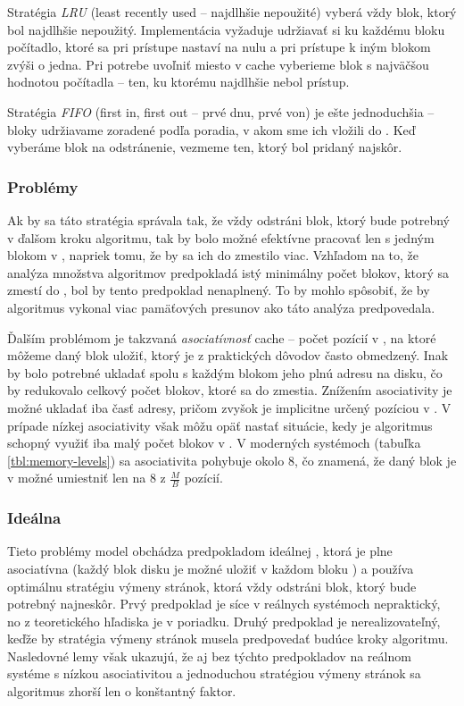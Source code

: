 Stratégia \emph{LRU} (least recently used -- najdlhšie nepoužité) vyberá vždy blok, ktorý bol najdlhšie nepoužitý. Implementácia vyžaduje udržiavať si ku každému bloku počítadlo, ktoré sa pri prístupe nastaví na nulu a pri prístupe k iným blokom zvýši o jedna. Pri potrebe uvoľniť miesto v cache vyberieme blok s najväčšou hodnotou počítadla -- ten, ku ktorému najdlhšie nebol prístup.

Stratégia \emph{FIFO} (first in, first out -- prvé dnu, prvé von) je ešte jednoduchšia -- bloky udržiavame zoradené podľa poradia, v akom sme ich vložili do \cache. Keď vyberáme blok na odstránenie, vezmeme ten, ktorý bol pridaný najskôr.

\subsubsection{Problémy}

Ak by sa táto stratégia správala tak, že vždy odstráni blok, ktorý bude potrebný v ďalšom kroku algoritmu, tak by bolo možné efektívne pracovať len s jedným blokom v \cache, napriek tomu, že by sa ich do \cache zmestilo viac. Vzhľadom na to, že analýza množstva \obliv algoritmov predpokladá istý minimálny počet blokov, ktorý sa zmestí do \cache, bol by tento predpoklad nenaplnený. To by mohlo spôsobiť, že by algoritmus vykonal viac pamäťových presunov ako táto analýza predpovedala.

Ďalším problémom je takzvaná \emph{asociatívnosť} cache -- počet pozícií v \cache, na ktoré môžeme daný blok uložiť, ktorý je z praktických dôvodov často obmedzený. Inak by bolo potrebné ukladať spolu s každým blokom jeho plnú adresu na disku, čo by redukovalo celkový počet blokov, ktoré sa do \cache zmestia. Znížením asociativity je možné ukladať iba časť adresy, pričom zvyšok je implicitne určený pozíciou v \cache. V prípade nízkej asociativity však môžu opäť nastať situácie, kedy je algoritmus schopný využiť iba malý počet blokov v \cache. V moderných systémoch (tabuľka \ref{tbl:memory-levels}) sa asociativita pohybuje okolo $8$, čo znamená, že daný blok je v \cache možné umiestniť len na $8$ z $\frac{M}{B}$ pozícií.

\subsubsection{Ideálna \cache}

Tieto problémy \obliv model obchádza predpokladom ideálnej \cache, ktorá je plne asociatívna (každý blok disku je možné uložiť v každom bloku \cache) a používa optimálnu stratégiu výmeny stránok, ktorá vždy odstráni blok, ktorý bude potrebný najneskôr. Prvý predpoklad je síce v reálnych systémoch nepraktický, no z teoretického hľadiska je v poriadku. Druhý predpoklad je nerealizovateľný, keďže by stratégia výmeny stránok musela predpovedať budúce kroky algoritmu. Nasledovné lemy však ukazujú, že aj bez týchto predpokladov na reálnom systéme s nízkou asociativitou a jednoduchou stratégiou výmeny stránok sa algoritmus zhorší len o konštantný faktor.

